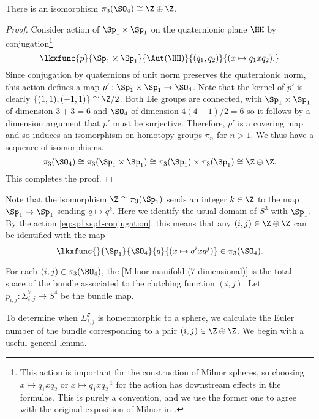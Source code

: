 \begin{proposition}\label{prop:3rd-homotopy-SO4}
	There is an isomorphism $\pi_3(\SO_4)\cong \Z\oplus \Z$.
\end{proposition}
\begin{proof}
	Consider action of $\Sp_1\times \Sp_1$ on the quaternionic plane $\HH$ by conjugation\footnote{This action is important for the construction of Milnor spheres, so choosing $x\mapsto q_1xq_2$ or $x\mapsto q_1xq_2^{-1}$ for the action has downstream effects in the formulas. This is purely a convention, and we use the former one to agree with the original exposition of Milnor in \cite{milnor1956manifolds}.}
	\begin{equation}\label{eq:sp1xsp1-conjugation}
		\lkxfunc{p}{\Sp_1\times \Sp_1}{\Aut(\HH)}{(q_1,q_2)}{(x\mapsto q_1xq_2).}
	\end{equation}
	Since conjugation by quaternions of unit norm preserves the quaternionic norm, this action defines a map $p' : \Sp_1\times \Sp_1\to\SO_4$.
	Note that the kernel of $p'$ is clearly $\{(1,1),(-1,1)\}\cong \Z/2$. Both Lie groups are connected, with $\Sp_1\times \Sp_1$ of dimension $3+3=6$ and $\SO_4$ of dimension $4(4-1)/2=6$ so it follows by a dimension argument that $p'$ must be surjective. Therefore, $p'$ is a covering map and so induces an isomorphism on homotopy groups $\pi_n$ for $n>1$. We thus have a sequence of isomorphisms.
	\[
		\pi_3(\SO_4)\cong \pi_3(\Sp_1\times \Sp_1)\cong \pi_3(\Sp_1)\times \pi_3(\Sp_1) \cong \Z\oplus \Z.
	\]
	This completes the proof.
\end{proof}

Note that the isomorphism $\Z\cong \pi_3(\Sp_1)$ sends an integer $k\in \Z$ to the map $\Sp_1\to \Sp_1$ sending $q\mapsto q^k$. Here we identify the usual domain of $S^3$ with $\Sp_1$. By the action \cref{eq:sp1xsp1-conjugation}, this means that any $(i,j)\in \Z\oplus\Z$ can be identified with the map
\begin{equation}\label{eq:ij-associated-map}
	\lkxfunc{}{\Sp_1}{\SO_4}{q}{(x\mapsto q^ixq^{j})}\in \pi_3(\SO_4).
\end{equation}
\begin{definition}
	For each $(i,j)\in \pi_3(\SO_4)$, the [Milnor manifold (7-dimensional)] is the total space of the bundle associated to the clutching function $(i,j)$. Let $p_{i,j} : \Sigma_{i,j}^7 \to S^4$ be the bundle map.
\end{definition}

To determine when $\Sigma_{i,j}^7$ is homeomorphic to a sphere, we calculate the Euler number of the bundle corresponding to a pair $(i,j)\in \Z\oplus\Z$. We begin with a useful general lemma.

